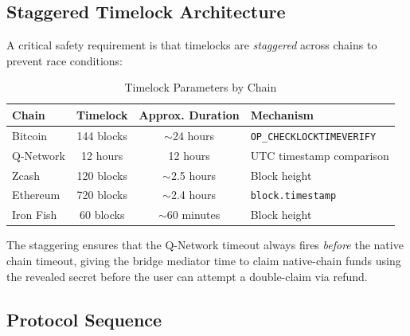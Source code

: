 \documentclass[11pt,a4paper]{article}
\begin{document}
\subsection{Staggered Timelock Architecture}

A critical safety requirement is that timelocks are \emph{staggered} across chains to prevent race conditions:

\begin{table}[H]
\centering
\caption{Timelock Parameters by Chain}
\label{tab:timelocks}
\begin{tabular}{l c c l}
\toprule
\textbf{Chain} & \textbf{Timelock} & \textbf{Approx. Duration} & \textbf{Mechanism} \\
\midrule
Bitcoin & 144 blocks & $\sim$24 hours & \texttt{OP\_CHECKLOCKTIMEVERIFY} \\
Q-Network & 12 hours & 12 hours & UTC timestamp comparison \\
Zcash & 120 blocks & $\sim$2.5 hours & Block height \\
Ethereum & 720 blocks & $\sim$2.4 hours & \texttt{block.timestamp} \\
Iron Fish & 60 blocks & $\sim$60 minutes & Block height \\
\bottomrule
\end{tabular}
\end{table}

The staggering ensures that the Q-Network timeout always fires \emph{before} the native chain timeout, giving the bridge mediator time to claim native-chain funds using the revealed secret before the user can attempt a double-claim via refund.

\subsection{Protocol Sequence}
\end{document}
